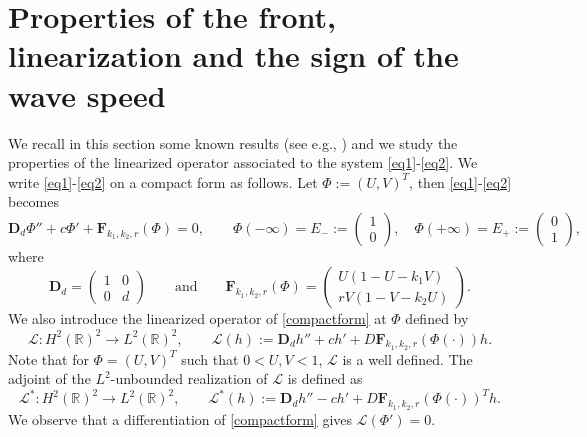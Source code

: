\documentclass[11pt]{article}
\numberwithin{equation}{section}
\newcommand{\1}{\mathbbm{1}}
\numberwithin{equation}{section}
\theoremstyle{definition}
\def \R {\mathbb{R}}
\def \F {\mathbf{F}}
\def \D {\mathbf{D}}
\def \L {\mathcal{L}}
\numberwithin{equation}{section}
\begin{document}
\section{Properties of the front, linearization and the sign of the wave speed}\label{speedsign}
We recall in this section some known results (see e.g., \cite{kan1995,kan1996,risler2017}) and we study the properties of the linearized operator associated to the system \eqref{eq1}-\eqref{eq2}. %
%
We write  \eqref{eq1}-\eqref{eq2} on a compact form as follows. Let $\Phi:=(U,V)^T$, then \eqref{eq1}-\eqref{eq2} becomes
\begin{equation}\label{compactform}
	\D_d \Phi''+c \Phi'+\F_{k_1,k_2,r}(\Phi)=0, \qquad \Phi(-\infty) = E_- := \begin{pmatrix}1\\0\end{pmatrix}, \quad \Phi(+\infty) = E_+ := \begin{pmatrix}0\\1\end{pmatrix}, 
\end{equation}
where
\begin{equation}\label{compactform1}
	\D_d = \begin{pmatrix}1&0\\0&d\end{pmatrix}
	\qquad\text{and}\qquad
	\F_{k_1,k_2,r}(\Phi) = \begin{pmatrix} U(1-U-k_1V) \\ rV(1-V-k_2U)\end{pmatrix}.
\end{equation}
We also introduce the linearized operator of \eqref{compactform} at $\Phi$ defined by
\begin{equation}\label{linearizedoperator}
\L: H^2(\R)^2 \to L^2(\R)^2, \qquad \L(h):=\D_dh''+ch'+D\F_{k_1,k_2,r}(\Phi(\cdot))h. %
\end{equation}
Note that for $\Phi=(U,V)^T$ such that $0<U,V<1$, $\L$ is a well defined. The adjoint of the $L^2$-unbounded realization of $\L$ is defined as 
\begin{equation}\label{linearizedoperator}
	\L^*: H^2(\R)^2 \to L^2(\R)^2, \qquad \L^*(h):=\D_dh''-ch'+D\F_{k_1,k_2,r}(\Phi(\cdot))^Th. %
\end{equation}
We observe that a differentiation of \eqref{compactform} gives $\L (\Phi')=0$.%
\end{document}
